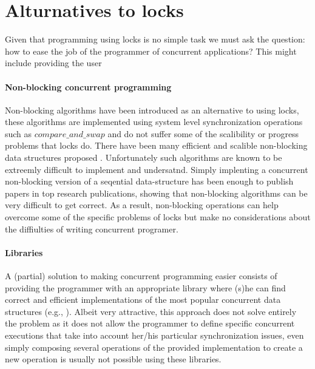 \section{Alturnatives to locks}
Given that programming using locks
is no simple task
we must ask the question:  how to  ease  the  job of  the programmer  of
concurrent applications?
This might include providing the user

\paragraph{Non-blocking concurrent programming}
Non-blocking algorithms \cite{GC96} have been introduced as an alternative to using
locks, these algorithms are implemented using system level synchronization operations such
as $compare\_and\_swap$ and do not suffer some of the scalibility or progress
problems that locks do.
There have been many efficient and scalible non-blocking data structures proposed
\cite{Mic02,ST04,Val96,FR04,Fra03}.
Unfortunately such algorithms are known to be extreemly difficult to implement
and undersatnd.
Simply implenting a concurrent non-blocking version of a seqential data-structure
has been enough to publish papers in top research publications, showing that
non-blocking algorithms can be very difficult to get correct.
As a result, non-blocking operations can help overcome some of the specific problems of locks
but make no considerations about the diffiulties of writing concurrent programer.


\paragraph{Libraries}
A (partial)  solution to making concurrent programming easier consists of providing 
the programmer with an appropriate 
library where  (s)he  can  find  correct  and  efficient  implementations  of  
the most popular concurrent data structures (e.g., \cite{HS08,MS96}). 
Albeit very attractive, this approach does not solve entirely the problem  
as it does not allow the programmer to define  specific concurrent executions 
that take into account  her/his particular  synchronization issues,
even simply composing several operations of the provided implementation
to create a new operation is usually not possible using these libraries.


